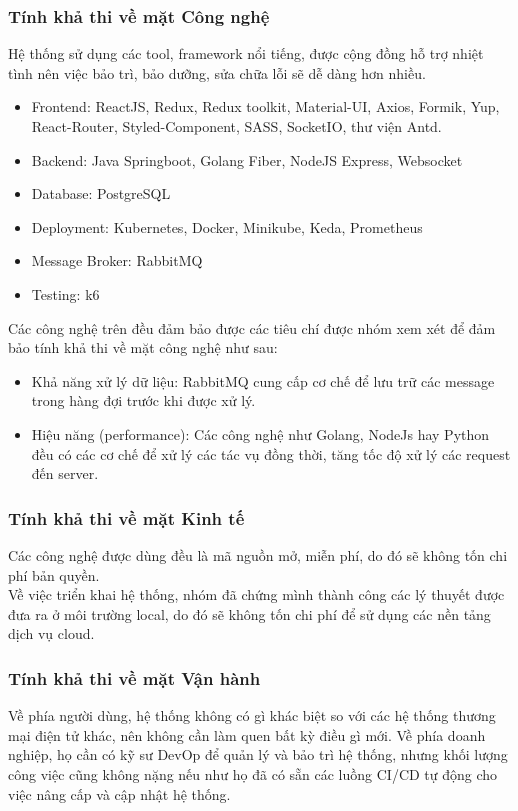 \subsubsection{Tính khả thi về mặt Công nghệ}
\noindent Hệ thống sử dụng các tool, framework nổi tiếng, được cộng đồng hỗ trợ nhiệt tình nên việc bảo trì, bảo dưỡng, sửa chữa lỗi sẽ dễ dàng hơn nhiều.
\begin{itemize}
    \item Frontend: ReactJS, Redux, Redux toolkit, Material-UI, Axios, Formik, Yup, React-Router, Styled-Component, SASS, SocketIO, thư viện Antd.
    \item Backend: Java Springboot, Golang Fiber, NodeJS Express, Websocket
    \item Database: PostgreSQL
    \item Deployment: Kubernetes, Docker, Minikube, Keda, Prometheus
    \item Message Broker: RabbitMQ
    \item Testing: k6
\end{itemize}
\noindent Các công nghệ trên đều đảm bảo được các tiêu chí được nhóm xem xét để đảm bảo tính khả thi về
mặt công nghệ như sau:
\begin{itemize}
    \item Khả năng xử lý dữ liệu: RabbitMQ cung cấp cơ chế để lưu trữ các message trong hàng đợi trước
    khi được xử lý.
    \item Hiệu năng (performance): Các công nghệ như Golang, NodeJs hay Python đều có các cơ chế để xử
    lý các tác vụ đồng thời, tăng tốc độ xử lý các request đến server.
\end{itemize}
\subsubsection{Tính khả thi về mặt Kinh tế}
\noindent Các công nghệ được dùng đều là mã nguồn mở, miễn phí, do đó sẽ không tốn chi phí bản quyền.\\[0.5cm]
Về việc triển khai hệ thống, nhóm đã chứng mình thành công các lý thuyết được đưa ra ở môi trường local, do đó
sẽ không tốn chi phí để sử dụng các nền tảng dịch vụ cloud.
\subsubsection{Tính khả thi về mặt Vận hành}
\noindent Về phía người dùng, hệ thống không có gì khác biệt so với các hệ thống thương mại điện tử khác, 
nên không cần làm quen bất kỳ điều gì mới. Về phía doanh nghiệp, họ cần có kỹ sư DevOp để quản lý và bảo trì hệ thống, 
nhưng khối lượng công việc cũng không nặng nếu như họ đã có sẵn các luồng CI/CD tự động cho việc nâng cấp và 
cập nhật hệ thống.
